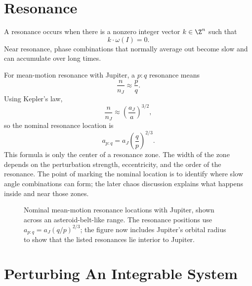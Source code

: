 \section{Resonance}
\label{sec:resonance}

\begin{definition}[Resonance]
A resonance occurs when there is a nonzero integer vector \(k\in\Z^n\) such
that
\[
  k\cdot\omega(I)=0.
\]
Near resonance, phase combinations that normally average out become slow and
can accumulate over long times.
\end{definition}

For mean-motion resonance with Jupiter, a \(p:q\) resonance means
\[
  \frac{n}{n_J}\approx \frac{p}{q}.
\]
Using Kepler's law,
\[
  \frac{n}{n_J}\approx
  \left(\frac{a_J}{a}\right)^{3/2},
\]
so the nominal resonance location is
\[
  \boxed{
  a_{p:q}=a_J\left(\frac{q}{p}\right)^{2/3}
  }.
\]
This formula is only the center of a resonance zone. The width of the zone
depends on the perturbation strength, eccentricity, and the order of the
resonance. The point of marking the nominal location is to identify where slow
angle combinations can form; the later chaos discussion explains what happens
inside and near those zones.

\begin{figure}[htbp]
\centering
{}
\caption{Nominal mean-motion resonance locations with Jupiter, shown
across an asteroid-belt-like range. The resonance positions use
\(a_{p:q}=a_J(q/p)^{2/3}\); the figure now includes Jupiter's orbital radius to
show that the listed resonances lie interior to Jupiter.}
\label{fig:jupiter-resonance-locations}
\end{figure}

\section{Perturbing An Integrable System}
\label{sec:perturbing-integrable-system}

